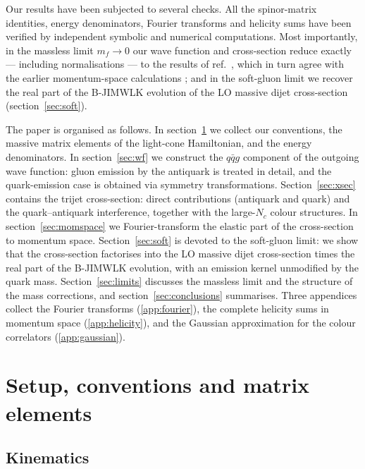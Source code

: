 \documentclass[11pt,a4paper]{article}
\numberwithin{equation}{section}
\begin{document}
Our results have been subjected to several checks. All the spinor-matrix identities, energy
denominators, Fourier transforms and helicity sums have been verified by independent symbolic
and numerical computations. Most importantly, in the massless limit $m_f\to 0$ our wave
function and cross-section reduce exactly --- including normalisations --- to the results of
ref.~\cite{Iancu:2022gpw}, which in turn agree with the earlier momentum-space calculations
\cite{Ayala:2016lhd,Ayala:2017rmh}; and in the soft-gluon limit we recover the real part of
the B-JIMWLK evolution of the LO massive dijet cross-section (section~\ref{sec:soft}).

The paper is organised as follows. In section~\ref{sec:setup} we collect our conventions, the
massive matrix elements of the light-cone Hamiltonian, and the energy denominators. In
section~\ref{sec:wf} we construct the $q\bar qg$ component of the outgoing wave function:
gluon emission by the antiquark is treated in detail, and the quark-emission case is obtained
via symmetry transformations. Section~\ref{sec:xsec} contains the trijet cross-section:
direct contributions (antiquark and quark) and the quark--antiquark interference, together with
the large-$N_c$ colour structures. In section~\ref{sec:momspace} we Fourier-transform the
elastic part of the cross-section to momentum space. Section~\ref{sec:soft} is devoted to
the soft-gluon limit: we show that the cross-section factorises into the LO massive dijet
cross-section times the real part of the B-JIMWLK evolution, with an emission kernel
unmodified by the quark mass. Section~\ref{sec:limits} discusses the
massless limit and the structure of the mass corrections, and section~\ref{sec:conclusions}
summarises. Three appendices collect the Fourier transforms (\ref{app:fourier}), the complete
helicity sums in momentum space (\ref{app:helicity}), and the Gaussian approximation for the
colour correlators (\ref{app:gaussian}).

\section{Setup, conventions and matrix elements}
\label{sec:setup}

\subsection{Kinematics}
\label{sec:kinematics}
\end{document}
